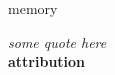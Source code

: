 



\begin{center}
\vspace*{\fill}
\Huge{memory}

\vspace{2cm}

\begin{flushright}
\large{
\textit{ some quote here}\\
\textbf{ attribution }}
\end{flushright}

\vspace*{\fill}
\end{center}
